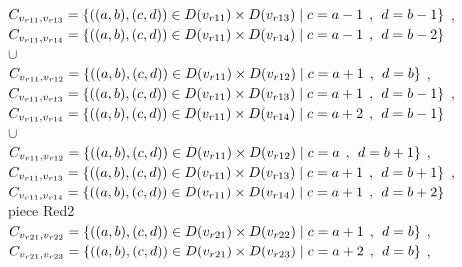\\$C_{v_{r11},v_{r13}}=\{((a,b),(c,d))\in D(v_{r11}) \times D(v_{r13})\mid c = a - 1\hspace{1ex} , \hspace{1ex}  d = b - 1 \}$ , 
\\$C_{v_{r11},v_{r14}}=\{((a,b),(c,d))\in D(v_{r11}) \times D(v_{r14})\mid c = a - 1\hspace{1ex} , \hspace{1ex}  d = b - 2 \}$  
\\$\cup$
\\$C_{v_{r11},v_{r12}}=\{((a,b),(c,d))\in D(v_{r11}) \times D(v_{r12})\mid c = a + 1\hspace{1ex} , \hspace{1ex}  d = b   \}$ , 
\\$C_{v_{r11},v_{r13}}=\{((a,b),(c,d))\in D(v_{r11}) \times D(v_{r13})\mid c = a + 1\hspace{1ex} , \hspace{1ex}  d = b - 1 \}$ , 
\\$C_{v_{r11},v_{r14}}=\{((a,b),(c,d))\in D(v_{r11}) \times D(v_{r14})\mid c = a + 2\hspace{1ex} , \hspace{1ex}  d = b - 1 \}$  
\\$\cup$
\\$C_{v_{r11},v_{r12}}=\{((a,b),(c,d))\in D(v_{r11}) \times D(v_{r12})\mid c = a   \hspace{1ex} , \hspace{1ex}  d = b + 1 \}$ , 
\\$C_{v_{r11},v_{r13}}=\{((a,b),(c,d))\in D(v_{r11}) \times D(v_{r13})\mid c = a + 1\hspace{1ex} , \hspace{1ex}  d = b + 1 \}$ , 
\\$C_{v_{r11},v_{r14}}=\{((a,b),(c,d))\in D(v_{r11}) \times D(v_{r14})\mid c = a + 1\hspace{1ex} , \hspace{1ex}  d = b + 2 \}$  
\\ piece Red2 
\\$C_{v_{r21},v_{r22}}=\{((a,b),(c,d))\in D(v_{r21}) \times D(v_{r22})\mid c = a + 1\hspace{1ex} , \hspace{1ex}  d = b    \}$ , 
\\$C_{v_{r21},v_{r23}}=\{((a,b),(c,d))\in D(v_{r21}) \times D(v_{r23})\mid c = a + 2\hspace{1ex} , \hspace{1ex}  d = b    \}$ , 
